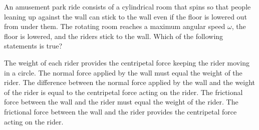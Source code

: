 \documentclass{../../../oss-classkick-exam}
\begin{document}
\begin{multicols*}{2}
\begin{questions}
\begin{choices}
      \choice

      \choice
     
      \choice
    \end{choices}

    
  \question An amusement park ride consists of a cylindrical room that spins so
    that people leaning up against the wall can stick to the wall even if the
    floor is lowered out from under them. The rotating room reaches a maximum
    angular speed $\omega$, the floor is lowered, and the riders stick to
    the wall. Which of the following statements is true?
    \begin{choices}
      \choice The weight of each rider provides the centripetal force keeping
      the rider moving in a circle.
      \choice The normal force applied by the wall must equal the weight of the
      rider.
      \choice The difference between the normal force applied by the wall and
      the weight of the rider is equal to the centripetal force acting on the
      rider.
      \choice The frictional force between the wall and the rider must equal the
      weight of the rider.
      \choice The frictional force between the wall and the rider provides the
      centripetal force acting on the rider.
    \end{choices}
    \vspace{.7in}

\end{questions}
\end{multicols*}
\end{document}
